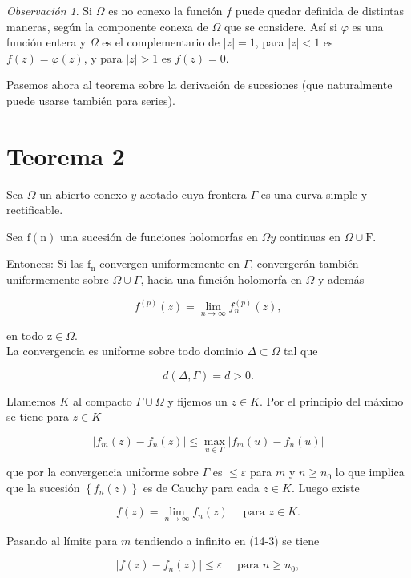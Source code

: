 \documentclass[10pt]{article}
\theoremstyle{plain}
\theoremstyle{definition}
\theoremstyle{remark}
\newtheorem{remark}[theorem]{Observación}
\begin{document}
\begin{remark}
Si $\Omega$ es no conexo la función $f$ puede quedar definida de distintas maneras, según la componente conexa de $\Omega$ que se considere. Así si $\varphi$ es una función entera y $\Omega$ es el complementario de $|z|=1$, para $|z|<1$ es $f(z)=\varphi(z)$, y para $|z|>1$ es $f(z)=0$.
\end{remark}


Pasemos ahora al teorema sobre la derivación de sucesiones (que naturalmente puede usarse también para series).

\section*{Teorema 2}
Sea $\Omega$ un abierto conexo $y$ acotado cuya frontera $\Gamma$ es una curva simple y rectificable.

Sea $\mathrm{f}(\mathrm{n})$ una sucesión de funciones holomorfas en $\Omega y$ continuas en $\Omega \cup \mathrm{F}$.

Entonces: Si las $\mathrm{f}_{\mathrm{n}}$ convergen uniformemente en $\Gamma$, convergerán también uniformemente sobre $\Omega \cup \Gamma$, hacia una función holomorfa en $\Omega$ y además

$$
f^{(p)}(z)=\lim _{n \rightarrow \infty} f_{n}^{(p)}(z),
$$

en todo $\mathrm{z} \in \Omega$.\\
La convergencia es uniforme sobre todo dominio $\Delta \subset \Omega$ tal que

$$
d(\Delta, \Gamma)=d>0 .
$$

Llamemos $K$ al compacto $\Gamma \cup \Omega$ y fijemos un $z \in K$. Por el principio del máximo se tiene para $z \in K$


\begin{equation*}
\left|f_{m}(z)-f_{n}(z)\right| \leqslant \max _{u \in \Gamma}\left|f_{m}(u)-f_{n}(u)\right| \tag{14-3}
\end{equation*}


que por la convergencia uniforme sobre $\Gamma$ es $\leqslant \varepsilon$ para $m$ y $n \geqslant n_{0}$ lo que implica que la sucesión $\left\{f_{n}(z)\right\}$ es de Cauchy para cada $z \in K$. Luego existe

$$
f(z)=\lim _{n \rightarrow \infty} f_{n}(z) \quad \text { para } z \in K .
$$

Pasando al límite para $m$ tendiendo a infinito en (14-3) se tiene

$$
\left|f(z)-f_{n}(z)\right| \leqslant \varepsilon \quad \text { para } n \geqslant n_0,
$$
\end{document}
